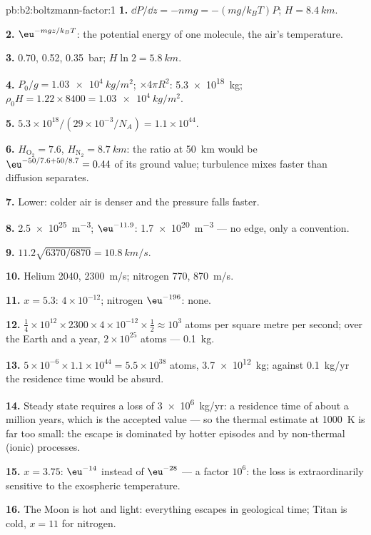 \begin{solution}{pb:b2:boltzmann-factor:1}
\textbf{1.} $\dd P/\dd z = -nmg = -(mg/k_BT)P$; $H = \qty{8.4}{km}$.

\textbf{2.} $\eu^{-mgz/k_BT}$: the potential energy of one molecule, the
air's temperature.

\textbf{3.} \qty{0.70}{}, \qty{0.52}{}, \qty{0.35}{bar}; $H\ln 2 = \qty{5.8}{km}$.

\textbf{4.} $P_0/g = \qty{1.03e4}{kg/m^2}$; $\times 4\pi R^2$: \qty{5.3e18}{kg}; $\rho_0H =
1.22 \times 8400 = \qty{1.03e4}{kg/m^2}$.

\textbf{5.} $5.3 \times 10^{18}/(29 \times 10^{-3}/N_A) = 1.1 \times 10^{44}$.

\textbf{6.} $H_{\text{O}_2} = 7.6$, $H_{\text{N}_2} = \qty{8.7}{km}$: the ratio at \qty{50}{km}
would be $\eu^{-50/7.6 + 50/8.7} = 0.44$ of its ground value; turbulence mixes
faster than diffusion separates.

\textbf{7.} Lower: colder air is denser and the pressure falls faster.

\textbf{8.} \qty{2.5e25}{m^{-3}}; $\eu^{-11.9}$: \qty{1.7e20}{m^{-3}} --- no edge, only a
convention.

\textbf{9.} $11.2\sqrt{6370/6870} = \qty{10.8}{km/s}$.

\textbf{10.} Helium \qty{2040}{}, \qty{2300}{m/s}; nitrogen \qty{770}{}, \qty{870}{m/s}.

\textbf{11.} $x = 5.3$: $4 \times 10^{-12}$; nitrogen $\eu^{-196}$: none.

\textbf{12.} $\tfrac14 \times 10^{12} \times 2300 \times 4 \times 10^{-12} \times \tfrac12 \approx
10^3$ atoms per square metre per second; over the Earth and a year,
$2 \times 10^{25}$ atoms --- \qty{0.1}{kg}.

\textbf{13.} $5 \times 10^{-6} \times 1.1 \times 10^{44} = 5.5 \times 10^{38}$ atoms, \qty{3.7e12}{kg};
against \qty{0.1}{kg/yr} the residence time would be absurd.

\textbf{14.} Steady state requires a loss of \qty{3e6}{kg/yr}: a residence
time of about a million years, which is the accepted value --- so the
thermal estimate at \qty{1000}{K} is far too small: the escape is
dominated by hotter episodes and by non-thermal (ionic) processes.

\textbf{15.} $x = 3.75$: $\eu^{-14}$ instead of $\eu^{-28}$ --- a factor $10^6$:
the loss is extraordinarily sensitive to the exospheric temperature.

\textbf{16.} The Moon is hot and light: everything escapes in
geological time; Titan is cold, $x = 11$ for nitrogen.


\end{solution}
